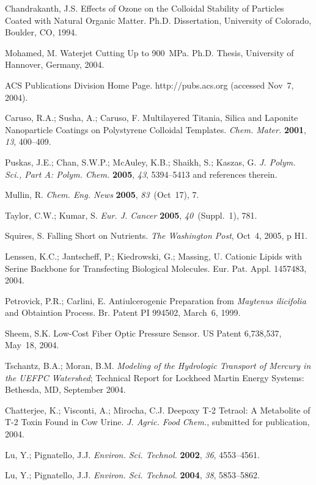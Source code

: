 \documentclass[]{interact}
\theoremstyle{plain}%
\theoremstyle{definition}
\theoremstyle{remark}
\begin{document}
\begin{thebibliography}{99}
Chandrakanth, J.S. Effects of Ozone on the Colloidal Stability of Particles
  Coated with Natural Organic Matter. Ph.D. Dissertation, University of
  Colorado, Boulder, CO, 1994.

Mohamed, M. Waterjet Cutting Up to 900~MPa. Ph.D. Thesis, University of
  Hannover, Germany, 2004.

ACS Publications Division Home Page. http://pubs.acs.org (accessed Nov~7,
  2004).

Caruso, R.A.; Susha, A.; Caruso, F. Multilayered Titania, Silica and Laponite 
  Nanoparticle Coatings on Polystyrene Colloidal Templates. \emph{Chem. Mater.} 
  \textbf{2001}, \emph{13}, 400--409.

Puskas, J.E.; Chan, S.W.P.; McAuley, K.B.; Shaikh, S.; Kaszas, G. \emph{J.
  Polym. Sci., Part A: Polym. Chem.} \textbf{2005}, \emph{43}, 5394--5413 and
  references therein.

Mullin, R. \emph{Chem. Eng. News} \textbf{2005}, \emph{83}~(Oct~17), 7.

Taylor, C.W.; Kumar, S. \emph{Eur. J. Cancer} \textbf{2005},
  \emph{40}~(Suppl.~1), 781.

Squires, S. Falling Short on Nutrients. \emph{The Washington Post}, Oct~4,
  2005, p H1.

Lenssen, K.C.; Jantscheff, P.; Kiedrowski, G.; Massing, U. Cationic Lipids with
  Serine Backbone for Transfecting Biological Molecules. Eur. Pat. Appl.
  1457483, 2004.

Petrovick, P.R.; Carlini, E. Antiulcerogenic Preparation from \emph{Maytenus
  ilicifolia} and Obtaintion Process. Br. Patent PI 994502, March~6, 1999.

Sheem, S.K. Low-Cost Fiber Optic Pressure Sensor. US Patent 6,738,537,
  May~18, 2004.

Tschantz, B.A.; Moran, B.M. \emph{Modeling of the Hydrologic Transport of
  Mercury in the UEFPC Watershed}; Technical Report for Lockheed Martin Energy 
  Systems: Bethesda, MD, September 2004.

Chatterjee, K.; Visconti, A.; Mirocha, C.J. Deepoxy T-2 Tetraol: A Metabolite
  of T-2 Toxin Found in Cow Urine. \emph{J. Agric. Food Chem.}, submitted for
  publication, 2004.

Lu, Y.; Pignatello, J.J. \emph{Environ. Sci. Technol.} \textbf{2002},
  \emph{36}, 4553--4561.

Lu, Y.; Pignatello, J.J. \emph{Environ. Sci. Technol.} \textbf{2004},
  \emph{38}, 5853--5862.

\end{thebibliography}
\bigskip
\end{document}
